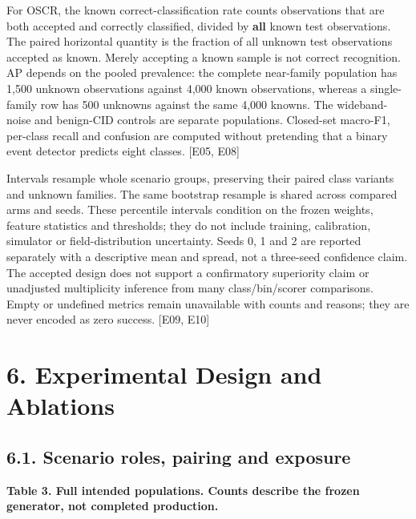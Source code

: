 \documentclass[
  10pt,
]{article}
\begin{document}
For OSCR, the known correct-classification rate counts observations that
are both accepted and correctly classified, divided by \textbf{all}
known test observations. The paired horizontal quantity is the fraction
of all unknown test observations accepted as known. Merely accepting a
known sample is not correct recognition. AP depends on the pooled
prevalence: the complete near-family population has 1,500 unknown
observations against 4,000 known observations, whereas a single-family
row has 500 unknowns against the same 4,000 knowns. The wideband-noise
and benign-CID controls are separate populations. Closed-set macro-F1,
per-class recall and confusion are computed without pretending that a
binary event detector predicts eight classes. {[}E05, E08{]}

Intervals resample whole scenario groups, preserving their paired class
variants and unknown families. The same bootstrap resample is shared
across compared arms and seeds. These percentile intervals condition on
the frozen weights, feature statistics and thresholds; they do not
include training, calibration, simulator or field-distribution
uncertainty. Seeds 0, 1 and 2 are reported separately with a descriptive
mean and spread, not a three-seed confidence claim. The accepted design
does not support a confirmatory superiority claim or unadjusted
multiplicity inference from many class/bin/scorer comparisons. Empty or
undefined metrics remain unavailable with counts and reasons; they are
never encoded as zero success. {[}E09, E10{]}

\section{6. Experimental Design and
Ablations}\label{experimental-design-and-ablations}

\subsection{6.1. Scenario roles, pairing and
exposure}\label{scenario-roles-pairing-and-exposure}

\textbf{Table 3. Full intended populations. Counts describe the frozen
generator, not completed production.}
\end{document}
